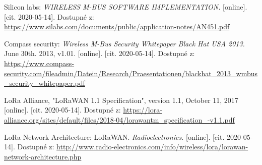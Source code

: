\begin{thebibliography}{9}


Silicon labs: 
\textit{
WIRELESS M-BUS SOFTWARE IMPLEMENTATION.
}
[online]. [cit. 2020-05-14]. Dostupné z: 
\url{
https://www.silabs.com/documents/public/application-notes/AN451.pdf
}


Compass security:
\textit{
Wireless M-Bus Security Whitepaper Black Hat USA 2013.
}
June 30th. 2013, v1.01.
[online]. [cit. 2020-05-14]. Dostupné z: 
\url{
https://www.compass-security.com/fileadmin/Datein/Research/Praesentationen/blackhat_2013_wmbus_security_whitepaper.pdf
}



LoRa Alliance, "LoRaWAN 1.1 Specification", version 1.1, October 11, 2017
[online]. [cit. 2020-05-14]. Dostupné z: 
\url{
https://lora-alliance.org/sites/default/files/2018-04/lorawantm_specification_-v1.1.pdf
}
 


LoRa Network Architecture: LoRaWAN.
\textit{
    Radioelectronics.
}
[online]. [cit. 2020-05-14]. Dostupné z: 
\url{
http://www.radio-electronics.com/info/wireless/lora/lorawan-network-architecture.php
}
 





\end{thebibliography}
